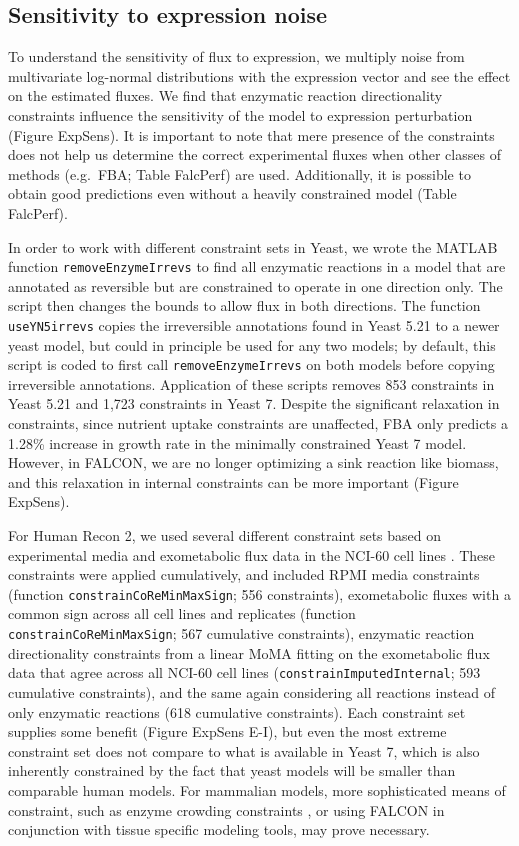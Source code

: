 \subsection{Sensitivity to expression noise}
To understand the sensitivity of flux to expression, we multiply noise
from multivariate log-normal distributions with the expression vector
and see the effect on the estimated fluxes. We find that enzymatic
reaction directionality constraints influence the sensitivity of the
model to expression perturbation (Figure ExpSens). It is important to
note that mere presence of the constraints does not help us determine
the correct experimental fluxes when other classes of methods (e.g.\
FBA; Table FalcPerf) are used. Additionally, it is possible to obtain
good predictions even without a heavily constrained model (Table
FalcPerf).

In order to work with different constraint sets in Yeast, we wrote the
MATLAB function \texttt{removeEnzymeIrrevs} to find all enzymatic
reactions in a model that are annotated as reversible but are
constrained to operate in one direction only. The script then changes
the bounds to allow flux in both directions. The function
\texttt{useYN5irrevs} copies the irreversible annotations found in
Yeast 5.21 \citep{Lee2012} to a newer yeast model, but could in
principle be used for any two models; by default, this script is coded
to first call \texttt{removeEnzymeIrrevs} on both models before
copying irreversible annotations. Application of these scripts removes
853 constraints in Yeast 5.21 and 1,723 constraints in Yeast
7. Despite the significant relaxation in constraints, since nutrient
uptake constraints are unaffected, FBA only predicts a 1.28\%
increase in growth rate in the minimally constrained Yeast 7
model. However, in FALCON, we are no longer optimizing a sink reaction
like biomass, and this relaxation in internal constraints can be more
important (Figure ExpSens).

For Human Recon 2, we used several different constraint sets based on
experimental media and exometabolic flux data in the NCI-60 cell lines
\citep{Jain2012}. These constraints were applied cumulatively, and
included RPMI media constraints (function
\texttt{constrainCoReMinMaxSign}; 556 constraints), exometabolic
fluxes with a common sign across all cell lines and replicates
(function \texttt{constrainCoReMinMaxSign}; 567 cumulative
constraints), enzymatic reaction directionality constraints from a
linear MoMA fitting on the exometabolic flux data that agree
across all NCI-60 cell lines (\texttt{constrainImputedInternal}; 593
cumulative constraints), and the same again considering all reactions
instead of only enzymatic reactions (618 cumulative constraints). Each
constraint set supplies some benefit (Figure ExpSens E-I), but even
the most extreme constraint set does not compare to what is available
in Yeast 7, which is also inherently constrained by the fact that
yeast models will be smaller than comparable human models.  For
mammalian models, more sophisticated means of constraint, such as
enzyme crowding constraints \citep{Shlomi2011}, or using FALCON in
conjunction with tissue specific modeling tools, may prove necessary.

